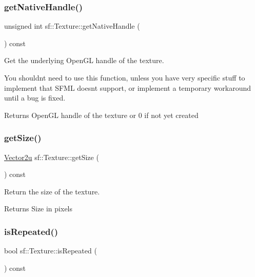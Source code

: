 \subsubsection{\texorpdfstring{get\+Native\+Handle()}{getNativeHandle()}}
{\footnotesize\ttfamily unsigned int sf\+::\+Texture\+::get\+Native\+Handle (\begin{DoxyParamCaption}{ }\end{DoxyParamCaption}) const}



Get the underlying Open\+GL handle of the texture. 

You shouldn\textquotesingle{}t need to use this function, unless you have very specific stuff to implement that S\+F\+ML doesn\textquotesingle{}t support, or implement a temporary workaround until a bug is fixed.

\begin{DoxyReturn}{Returns}
Open\+GL handle of the texture or 0 if not yet created 
\end{DoxyReturn}
\mbox{\label{classsf_1_1_texture_a9f86b8cc670c6399c539d4ce07ae5c8a}} 
\subsubsection{\texorpdfstring{get\+Size()}{getSize()}}
{\footnotesize\ttfamily \hyperlink{classsf_1_1_vector2}{Vector2u} sf\+::\+Texture\+::get\+Size (\begin{DoxyParamCaption}{ }\end{DoxyParamCaption}) const}



Return the size of the texture. 

\begin{DoxyReturn}{Returns}
Size in pixels 
\end{DoxyReturn}
\mbox{\label{classsf_1_1_texture_af1a1a32ca5c799204b2bea4040df7647}} 
\subsubsection{\texorpdfstring{is\+Repeated()}{isRepeated()}}
{\footnotesize\ttfamily bool sf\+::\+Texture\+::is\+Repeated (\begin{DoxyParamCaption}{ }\end{DoxyParamCaption}) const}



